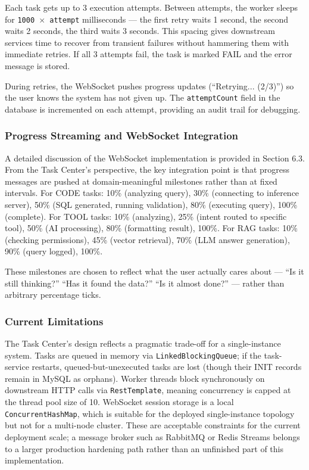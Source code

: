 Each task gets up to 3 execution attempts. Between attempts, the worker sleeps for \texttt{1000 $\times$ attempt} milliseconds --- the first retry waits 1 second, the second waits 2 seconds, the third waits 3 seconds. This spacing gives downstream services time to recover from transient failures without hammering them with immediate retries. If all 3 attempts fail, the task is marked FAIL and the error message is stored.

During retries, the WebSocket pushes progress updates (``Retrying... (2/3)'') so the user knows the system has not given up. The \texttt{attemptCount} field in the database is incremented on each attempt, providing an audit trail for debugging.

\subsubsection{Progress Streaming and WebSocket Integration}

A detailed discussion of the WebSocket implementation is provided in Section 6.3. From the Task Center's perspective, the key integration point is that progress messages are pushed at domain-meaningful milestones rather than at fixed intervals. For CODE tasks: 10\% (analyzing query), 30\% (connecting to inference server), 50\% (SQL generated, running validation), 80\% (executing query), 100\% (complete). For TOOL tasks: 10\% (analyzing), 25\% (intent routed to specific tool), 50\% (AI processing), 80\% (formatting result), 100\%. For RAG tasks: 10\% (checking permissions), 45\% (vector retrieval), 70\% (LLM answer generation), 90\% (query logged), 100\%.

These milestones are chosen to reflect what the user actually cares about --- ``Is it still thinking?'' ``Has it found the data?'' ``Is it almost done?'' --- rather than arbitrary percentage ticks.

\subsubsection{Current Limitations}

The Task Center's design reflects a pragmatic trade-off for a single-instance system. Tasks are queued in memory via \texttt{LinkedBlockingQueue}; if the task-service restarts, queued-but-unexecuted tasks are lost (though their INIT records remain in MySQL as orphans). Worker threads block synchronously on downstream HTTP calls via \texttt{RestTemplate}, meaning concurrency is capped at the thread pool size of 10. WebSocket session storage is a local \texttt{ConcurrentHashMap}, which is suitable for the deployed single-instance topology but not for a multi-node cluster. These are acceptable constraints for the current deployment scale; a message broker such as RabbitMQ or Redis Streams belongs to a larger production hardening path rather than an unfinished part of this implementation.

